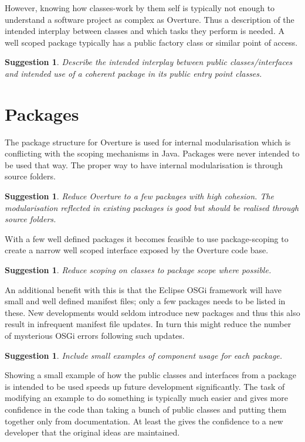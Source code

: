 \documentclass{overturerep}
\newtheorem{sug}[subsection]{Suggestion}
\begin{document}
However, knowing how classes-work by them self is typically not enough
to understand a software project as complex as Overture.  Thus a
description of the intended interplay between classes and which tasks
they perform is needed. A well scoped package typically has a public
factory class or similar point of access.

\begin{sug}
  Describe the intended interplay between \emph{public}
  classes/interfaces and intended use of a coherent package in its
  public entry point classes.
\end{sug}

\section{Packages}
The package structure for Overture is used for internal modularisation
which is conflicting with the scoping mechanisms in Java. Packages
were never intended to be used that way. The proper way to have
internal modularisation is through source folders.

\begin{sug}
  Reduce Overture to a few packages with high cohesion. The
  modularisation reflected in existing packages is good but should be
  realised through source folders.
\end{sug}

With a few well defined packages it becomes feasible to use
package-scoping to create a narrow well scoped interface exposed by
the Overture code base.

\begin{sug}
  Reduce scoping on classes to package scope where possible. 
\end{sug}

An additional benefit with this is that the Eclipse OSGi framework
will have small and well defined manifest files; only a few packages
needs to be listed in these. New developments would seldom introduce
new packages and thus this also result in infrequent manifest file
updates. In turn this might reduce the number of mysterious OSGi
errors following such updates.

\begin{sug}
  Include small examples of component usage for each package.
\end{sug}

Showing a small example of how the public classes and interfaces from
a package is intended to be used speeds up future development
significantly. The task of modifying an example to do something is
typically much easier and gives more confidence in the code than
taking a bunch of public classes and putting them together only from
documentation. At least the gives the confidence to a new developer
that the original ideas are maintained.
\end{document}
